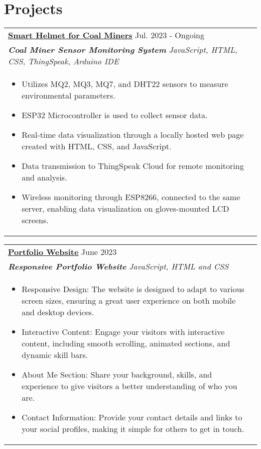 \documentclass[a4paper,8pt]{article}
\begin{document}
\section{Projects}
\begin{tabularx}{\linewidth}{ @{}l r@{} }
\color[HTML]{1C033C} \textbf{\uline{\href{https://github.com/akc2531/COALMINERS}{Smart Helmet for Coal Miners}}} \hfill \color[HTML]{371e77} Jul. 2023 - Ongoing \\[4pt]
\color[HTML]{371e77}\textbf{\textit{Coal Miner Sensor Monitoring System }} \hfill \color[HTML]{4B28A4} \textit{ JavaScript, HTML, CSS, ThingSpeak, Arduino IDE} \\[5pt]
\begin{minipage}[t]{\linewidth}
    \begin{itemize}[nosep,after=\strut, leftmargin=2em, itemsep=2pt]
        \item Utilizes MQ2, MQ3, MQ7, and DHT22 sensors to measure environmental parameters.
        \item ESP32 Microcontroller is used to collect sensor data.
        \item Real-time data visualization through a locally hosted web page created with HTML, CSS, and JavaScript.
        \item Data transmission to ThingSpeak Cloud for remote monitoring and analysis.
        \item Wireless monitoring through ESP8266, connected to the same server, enabling data visualization on gloves-mounted LCD screens.
    \end{itemize}
    \end{minipage}
\end{tabularx}

\begin{tabularx}{\linewidth}{ @{}l r@{} }
\color[HTML]{1C033C} \textbf{\uline{\href{https://akc2531.github.io/MyPortfolio/}{Portfolio Website}}} \hfill \color[HTML]{371e77} June 2023 \\[4pt]
\color[HTML]{371e77}\textbf{\textit{Responsive Portfolio Website}} \hfill \color[HTML]{4B28A4} \textit{ JavaScript, HTML and CSS} \\[5pt]
\begin{minipage}[t]{\linewidth}
    \begin{itemize}[nosep,after=\strut, leftmargin=2em, itemsep=2pt]
        \item Responsive Design: The website is designed to adapt to various screen sizes, ensuring a great user experience on both mobile and desktop devices.
        \item Interactive Content: Engage your visitors with interactive content, including smooth scrolling, animated sections, and dynamic skill bars.
        \item About Me Section: Share your background, skills, and experience to give visitors a better understanding of who you are.
        \item Contact Information: Provide your contact details and links to your social profiles, making it simple for others to get in touch.
    \end{itemize}
    \end{minipage}
\end{tabularx}
\end{document}
